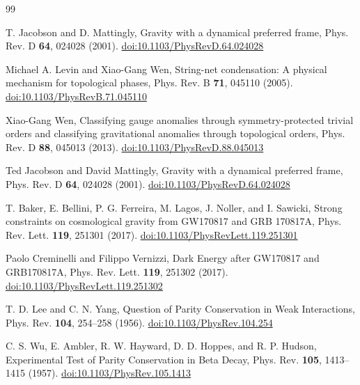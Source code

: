 \documentclass[smallextended]{svjour3}       %
\begin{document}
        \begin{thebibliography}{99}\setlength{\itemsep}{1pt}

        T. Jacobson and D. Mattingly,
        \newblock Gravity with a dynamical preferred frame,
        \newblock Phys. Rev. D \textbf{64}, 024028 (2001).
        \newblock \href{https://doi.org/10.1103/PhysRevD.64.024028}{doi:10.1103/PhysRevD.64.024028}

        Michael A. Levin and Xiao-Gang Wen,
        String-net condensation: A physical mechanism for topological phases,
        Phys. Rev. B \textbf{71}, 045110 (2005).
        \href{https://doi.org/10.1103/PhysRevB.71.045110}{doi:10.1103/PhysRevB.71.045110}

        Xiao-Gang Wen,
        Classifying gauge anomalies through symmetry-protected trivial orders and classifying gravitational anomalies through topological orders,
        Phys. Rev. D \textbf{88}, 045013 (2013).
        \href{https://doi.org/10.1103/PhysRevD.88.045013}{doi:10.1103/PhysRevD.88.045013}

        Ted Jacobson and David Mattingly,
        Gravity with a dynamical preferred frame,
        Phys. Rev. D \textbf{64}, 024028 (2001).
        \href{https://doi.org/10.1103/PhysRevD.64.024028}{doi:10.1103/PhysRevD.64.024028}

        T. Baker, E. Bellini, P. G. Ferreira, M. Lagos, J. Noller, and I. Sawicki,
        Strong constraints on cosmological gravity from GW170817 and GRB 170817A,
        Phys. Rev. Lett. \textbf{119}, 251301 (2017).
        \href{https://doi.org/10.1103/PhysRevLett.119.251301}{doi:10.1103/PhysRevLett.119.251301}

        Paolo Creminelli and Filippo Vernizzi,
        Dark Energy after GW170817 and GRB170817A,
        Phys. Rev. Lett. \textbf{119}, 251302 (2017).
        \href{https://doi.org/10.1103/PhysRevLett.119.251302}{doi:10.1103/PhysRevLett.119.251302}

        T. D. Lee and C. N. Yang,
        Question of Parity Conservation in Weak Interactions,
        Phys. Rev. \textbf{104}, 254--258 (1956).
        \href{https://doi.org/10.1103/PhysRev.104.254}{doi:10.1103/PhysRev.104.254}

        C. S. Wu, E. Ambler, R. W. Hayward, D. D. Hoppes, and R. P. Hudson,
        Experimental Test of Parity Conservation in Beta Decay,
        Phys. Rev. \textbf{105}, 1413--1415 (1957).
        \href{https://doi.org/10.1103/PhysRev.105.1413}{doi:10.1103/PhysRev.105.1413}


\end{thebibliography}
\end{document}
